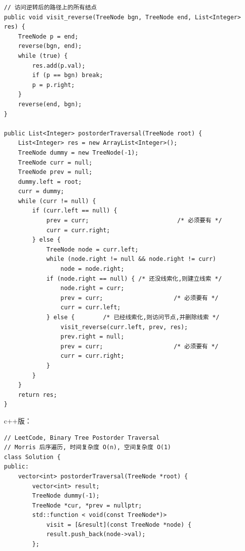 \documentclass[12pt]{book}
\begin{document}
\begin{enumerate}
\begin{lstlisting}
// 访问逆转后的路径上的所有结点
public void visit_reverse(TreeNode bgn, TreeNode end, List<Integer> res) {
    TreeNode p = end;
    reverse(bgn, end);
    while (true) {
        res.add(p.val);
        if (p == bgn) break;
        p = p.right;
    }
    reverse(end, bgn);
}

public List<Integer> postorderTraversal(TreeNode root) {
    List<Integer> res = new ArrayList<Integer>();
    TreeNode dummy = new TreeNode(-1);
    TreeNode curr = null;
    TreeNode prev = null;
    dummy.left = root;
    curr = dummy;
    while (curr != null) {
        if (curr.left == null) {
            prev = curr;                         /* 必须要有 */
            curr = curr.right;
        } else {
            TreeNode node = curr.left;
            while (node.right != null && node.right != curr)
                node = node.right;
            if (node.right == null) { /* 还没线索化,则建立线索 */
                node.right = curr;
                prev = curr;                    /* 必须要有 */
                curr = curr.left;
            } else {        /* 已经线索化,则访问节点,并删除线索 */
                visit_reverse(curr.left, prev, res);
                prev.right = null;
                prev = curr;                    /* 必须要有 */
                curr = curr.right;
            }
        }
    }
    return res;
}
\end{lstlisting}

c++版：

\lstset{language=java,label= ,caption= ,numbers=none}
\begin{lstlisting}
// LeetCode, Binary Tree Postorder Traversal
// Morris 后序遍历, 时间复杂度 O(n), 空间复杂度 O(1)
class Solution {
public:
    vector<int> postorderTraversal(TreeNode *root) {
        vector<int> result;
        TreeNode dummy(-1);
        TreeNode *cur, *prev = nullptr;
        std::function < void(const TreeNode*)>
            visit = [&result](const TreeNode *node) {
            result.push_back(node->val);
        };


\end{lstlisting}
\end{enumerate}
\end{document}
